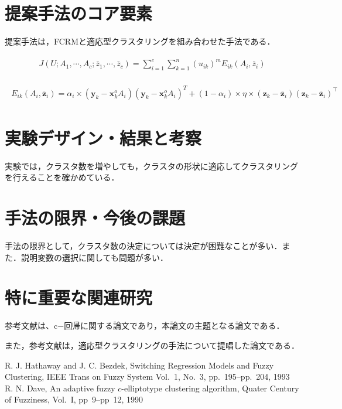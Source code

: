 \documentclass[10pt,onecolumn]{jsarticle}
\begin{document}
\section{提案手法のコア要素}
提案手法は，FCRMと適応型クラスタリングを組み合わせた手法である．

\begin{align}
	\begin{aligned}
J\left(U ; A_{1}, \cdots, A_{c} ; \bar{z}_{1}, \cdots, \bar{z}_{c}\right)=\sum_{i=1}^{c} \sum_{k=1}^{n}\left(u_{i k}\right)^{m} E_{i k}\left(A_{i}, \bar{z}_{i}\right)
\end{aligned}
\end{align}

\begin{align}
\begin{aligned}
E_{i k}\left(A_{i}, \overline{\bm{z}}_{i}\right)=\alpha_{i} \times\left(\bm{y}_{k}-\bm{x}_{k}^{o} A_{i}\right)\left(\bm{y}_{k}-\bm{x}_{k}^{o} A_{i}\right)^{T}
+\left(1-\alpha_{i}\right) \times \eta \times\left(\bm{z}_{k}-\overline{\bm{z}}_{i}\right)\left(\bm{z}_{k}-\overline{\bm{z}}_{i}\right)^{\top}
\end{aligned}
\end{align}

\section{実験デザイン・結果と考察}
実験では，クラスタ数を増やしても，クラスタの形状に適応してクラスタリングを行えることを確かめている．
\section{手法の限界・今後の課題}
手法の限界として，クラスタ数の決定については決定が困難なことが多い．また．説明変数の選択に関しても問題が多い．
\section{特に重要な関連研究}
参考文献\cite{ref1}は、c$-$回帰に関する論文であり，本論文の主題となる論文である．

また，参考文献\cite{ref2}は，適応型クラスタリングの手法について提唱した論文である．

\begin{thebibliography}{99}
%
	R. J. Hathaway and J. C. Bezdek, Switching Regression Models and Fuzzy Clustering, IEEE Trans on Fuzzy System Vol.~1, No.~3, pp.~195--pp.~204, 1993
	R. N. Dave, An adaptive fuzzy $c$-elliptotype clustering algorithm, Quater Century of  Fuzziness, Vol.~I, pp~9--pp~12, 1990
%

\end{thebibliography}



\end{document}
